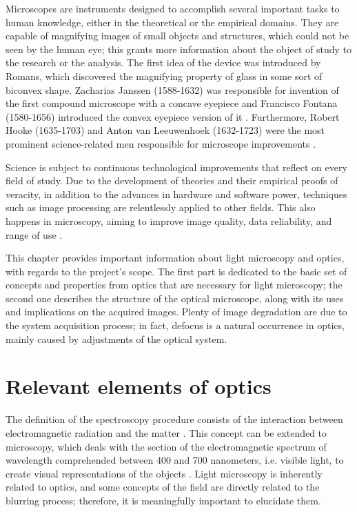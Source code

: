 Microscopes are instruments designed to accomplish several important tasks to human knowledge, either in the theoretical or the empirical domains. They are capable of magnifying images of small objects and structures, which could not be seen by the human eye; this grants more information about the object of study to the research or the analysis. The first idea of the device was introduced by Romans, which discovered the magnifying property of glass in some sort of biconvex shape. Zacharias Janssen (1588-1632) was responsible for invention of the first compound microscope with a concave eyepiece and  Francisco Fontana (1580-1656) introduced the convex eyepiece version of it \cite{zilio2009optica}. Furthermore, Robert Hooke (1635-1703) and Anton van Leeuwenhoek (1632-1723) were the most prominent science-related men responsible for microscope improvements \cite{wu2008microscope}.

Science is subject to continuous technological improvements that reflect on every field of study. Due to the development of theories and their empirical proofs of veracity, in addition to the advances in hardware and software power, techniques such as image processing are relentlessly applied to other fields. This also happens in microscopy, aiming to improve image quality, data reliability, and range of use \cite{boyde1990modern}.

This chapter provides important information about light microscopy and optics, with regards to the project's scope. The first part is dedicated to the basic set of concepts and properties from optics that are necessary for light microscopy; the second one describes the structure of the optical microscope, along with its uses and implications on the acquired images. Plenty of image degradation are due to the system acquisition process; in fact, defocus is a natural occurrence in optics, mainly caused by adjustments of the optical system.

\section{Relevant elements of optics}

The definition of the spectroscopy procedure consists of the interaction between electromagnetic radiation and the matter \cite{gauglitz2006handbook}. This concept can be extended to microscopy, which deals with the section of the electromagnetic spectrum of wavelength comprehended between 400 and 700 nanometers, i.e. visible light,  to create visual representations of the objects
\cite{bell2009introduction}. Light microscopy is inherently related to optics, and some concepts of the field are directly related to the blurring process; therefore, it is meaningfully important to elucidate them.

